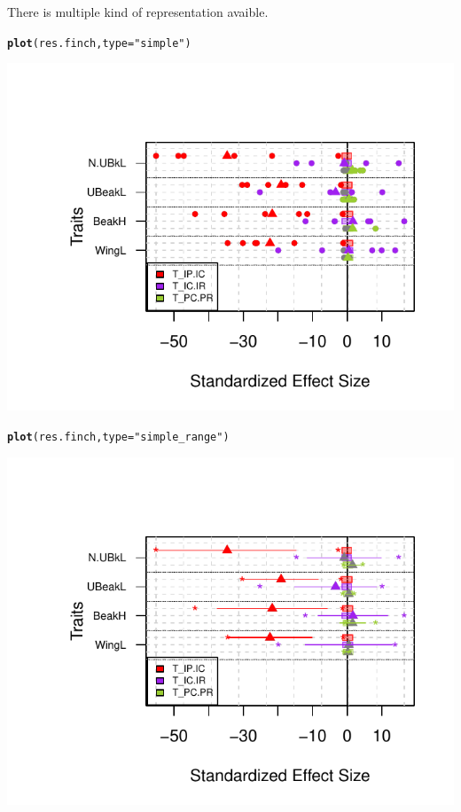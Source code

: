 \documentclass[12pt]{article}\usepackage[]{graphicx}\usepackage[]{color}
\makeatletter
\def\maxwidth{ %
  \ifdim\Gin@nat@width>\linewidth
    \linewidth
  \else
    \Gin@nat@width
  \fi
}
\newcommand{\hlstr}[1]{\textcolor[rgb]{0.192,0.494,0.8}{#1}}%
\newcommand{\hlstd}[1]{\textcolor[rgb]{0.345,0.345,0.345}{#1}}%
\newcommand{\hlkwc}[1]{\textcolor[rgb]{0.333,0.667,0.333}{#1}}%
\newcommand{\hlkwd}[1]{\textcolor[rgb]{0.737,0.353,0.396}{\textbf{#1}}}%
\newenvironment{kframe}{%
 \def\at@end@of@kframe{}%
 \ifinner\ifhmode%
  \def\at@end@of@kframe{\end{minipage}}%
  \begin{minipage}{\columnwidth}%
 \fi\fi%
 \def\FrameCommand##1{\hskip\@totalleftmargin \hskip-\fboxsep
 \colorbox{shadecolor}{##1}\hskip-\fboxsep
     \hskip-\linewidth \hskip-\@totalleftmargin \hskip\columnwidth}%
 \MakeFramed {\advance\hsize-\width
   \@totalleftmargin\z@ \linewidth\hsize
   \@setminipage}}%
 {\par\unskip\endMakeFramed%
 \at@end@of@kframe}
\newenvironment{knitrout}{}{} %
\makeatother
\begin{document}
There is multiple kind of representation avaible.
\begin{knitrout}
\color{fgcolor}\begin{kframe}
\begin{alltt}
\hlkwd{plot}\hlstd{(res.finch,} \hlkwc{type} \hlstd{=} \hlstr{"simple"}\hlstd{)}
\end{alltt}
\end{kframe}

{\centering \includegraphics[width=\maxwidth]{figure/unnamed-chunk-351} 

}


\begin{kframe}\begin{alltt}
\hlkwd{plot}\hlstd{(res.finch,} \hlkwc{type} \hlstd{=} \hlstr{"simple_range"}\hlstd{)}
\end{alltt}
\end{kframe}

{\centering \includegraphics[width=\maxwidth]{figure/unnamed-chunk-352} 

}
\end{knitrout}
\end{document}
